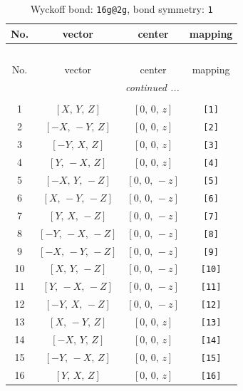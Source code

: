 \documentclass[fleqn,8pt]{jsarticle}
\begin{document}
\begin{longtable}{cccc}
\caption{Wyckoff bond: {\tt 16g@2g}, bond symmetry: {\tt 1}}
 \\
 \hline \hline
No. & vector & center & mapping \\ \hline \endfirsthead

\multicolumn{3}{l}{\tablename\ \thetable{}} \\
 \hline \hline
No. & vector & center & mapping \\ \hline \endhead

 \hline \hline
\multicolumn{3}{r}{\footnotesize\it continued ...} \\ \endfoot

 \hline \hline
\multicolumn{3}{r}{} \\ \endlastfoot

1 & $\left[ X,\, Y,\, Z \right]$ & $\left[ 0,\, 0,\, z \right]$ & {\tt [1]} \\ \hline
2 & $\left[ - X,\, - Y,\, Z \right]$ & $\left[ 0,\, 0,\, z \right]$ & {\tt [2]} \\ \hline
3 & $\left[ - Y,\, X,\, Z \right]$ & $\left[ 0,\, 0,\, z \right]$ & {\tt [3]} \\ \hline
4 & $\left[ Y,\, - X,\, Z \right]$ & $\left[ 0,\, 0,\, z \right]$ & {\tt [4]} \\ \hline
5 & $\left[ - X,\, Y,\, - Z \right]$ & $\left[ 0,\, 0,\, - z \right]$ & {\tt [5]} \\ \hline
6 & $\left[ X,\, - Y,\, - Z \right]$ & $\left[ 0,\, 0,\, - z \right]$ & {\tt [6]} \\ \hline
7 & $\left[ Y,\, X,\, - Z \right]$ & $\left[ 0,\, 0,\, - z \right]$ & {\tt [7]} \\ \hline
8 & $\left[ - Y,\, - X,\, - Z \right]$ & $\left[ 0,\, 0,\, - z \right]$ & {\tt [8]} \\ \hline
9 & $\left[ - X,\, - Y,\, - Z \right]$ & $\left[ 0,\, 0,\, - z \right]$ & {\tt [9]} \\ \hline
10 & $\left[ X,\, Y,\, - Z \right]$ & $\left[ 0,\, 0,\, - z \right]$ & {\tt [10]} \\ \hline
11 & $\left[ Y,\, - X,\, - Z \right]$ & $\left[ 0,\, 0,\, - z \right]$ & {\tt [11]} \\ \hline
12 & $\left[ - Y,\, X,\, - Z \right]$ & $\left[ 0,\, 0,\, - z \right]$ & {\tt [12]} \\ \hline
13 & $\left[ X,\, - Y,\, Z \right]$ & $\left[ 0,\, 0,\, z \right]$ & {\tt [13]} \\ \hline
14 & $\left[ - X,\, Y,\, Z \right]$ & $\left[ 0,\, 0,\, z \right]$ & {\tt [14]} \\ \hline
15 & $\left[ - Y,\, - X,\, Z \right]$ & $\left[ 0,\, 0,\, z \right]$ & {\tt [15]} \\ \hline
16 & $\left[ Y,\, X,\, Z \right]$ & $\left[ 0,\, 0,\, z \right]$ & {\tt [16]} \\
\end{longtable}
\end{document}
